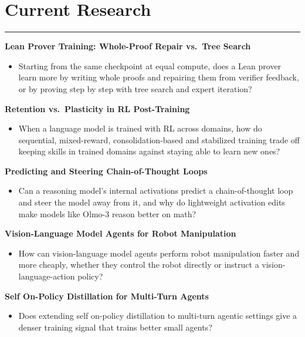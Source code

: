 \documentclass[11pt]{article}
\begin{document}
\section*{Current Research}
\hrule
\noindent
\textbf{Lean Prover Training: Whole-Proof Repair vs.\ Tree Search}\vspace{-\parskip}
\begin{itemize}[leftmargin=1.5em, topsep=0pt, partopsep=0pt, itemsep=0pt, parsep=0pt]
    \item Starting from the same checkpoint at equal compute, does a Lean prover learn more by writing whole proofs and repairing them from verifier feedback, or by proving step by step with tree search and expert iteration?
\end{itemize}

\noindent
\textbf{Retention vs.\ Plasticity in RL Post-Training}\vspace{-\parskip}
\begin{itemize}[leftmargin=1.5em, topsep=0pt, partopsep=0pt, itemsep=0pt, parsep=0pt]
    \item When a language model is trained with RL across domains, how do sequential, mixed-reward, consolidation-based and stabilized training trade off keeping skills in trained domains against staying able to learn new ones?
\end{itemize}

\noindent
\textbf{Predicting and Steering Chain-of-Thought Loops}\vspace{-\parskip}
\begin{itemize}[leftmargin=1.5em, topsep=0pt, partopsep=0pt, itemsep=0pt, parsep=0pt]
    \item Can a reasoning model's internal activations predict a chain-of-thought loop and steer the model away from it, and why do lightweight activation edits make models like Olmo-3 reason better on math?
\end{itemize}

\noindent
\textbf{Vision-Language Model Agents for Robot Manipulation}\vspace{-\parskip}
\begin{itemize}[leftmargin=1.5em, topsep=0pt, partopsep=0pt, itemsep=0pt, parsep=0pt]
    \item How can vision-language model agents perform robot manipulation faster and more cheaply, whether they control the robot directly or instruct a vision-language-action policy?
\end{itemize}

\noindent
\textbf{Self On-Policy Distillation for Multi-Turn Agents}\vspace{-\parskip}
\begin{itemize}[leftmargin=1.5em, topsep=0pt, partopsep=0pt, itemsep=0pt, parsep=0pt]
    \item Does extending self on-policy distillation to multi-turn agentic settings give a denser training signal that trains better small agents?
\end{itemize}
\end{document}
